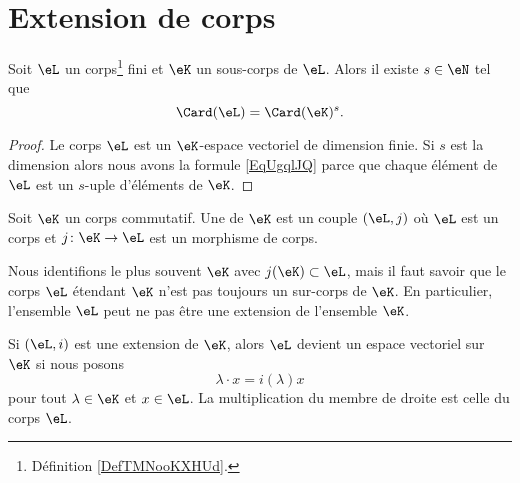 
\section{Extension de corps}
\label{SECooLQVJooTGeqiR}

\begin{lemma}       \label{LemobATFP}
	Soit \( \eL\) un corps\footnote{Définition \ref{DefTMNooKXHUd}.} fini et \( \eK\) un sous-corps de \( \eL\). Alors il existe \( s\in \eN\) tel que
	\begin{equation}        \label{EqUgqlJQ}
		\Card(\eL)=\Card(\eK)^s.
	\end{equation}
\end{lemma}

\begin{proof}
	Le corps \( \eL\) est un \( \eK\)-espace vectoriel de dimension finie. Si \( s\) est la dimension alors nous avons la formule \eqref{EqUgqlJQ} parce que chaque élément de \( \eL\) est un \( s\)-uple d'éléments de \( \eK\).
\end{proof}


\begin{definition}     \label{DEFooFLJJooGJYDOe}
	Soit \( \eK\) un corps commutatif. Une  de \( \eK\) est un couple \( (\eL,j)\) où \( \eL\) est un corps et \( j\colon \eK\to \eL\) est un morphisme de corps.
\end{definition}

Nous identifions le plus souvent \( \eK\) avec \( j(\eK)\subset \eL\), mais il faut savoir que le corps \( \eL\) étendant \( \eK\) n'est pas toujours un sur-corps de \( \eK\). En particulier, l'ensemble \( \eL\) peut ne pas être une extension de l'ensemble \( \eK\).

\begin{lemmaDef}       \label{LemooOLIIooXzdppM}
	Si \( (\eL,i)\) est une extension de \( \eK\), alors \( \eL\) devient un espace vectoriel sur \( \eK\) si nous posons
	\begin{equation}
		\lambda\cdot x=i(\lambda)x
	\end{equation}
	pour tout \( \lambda\in \eK\) et \( x\in \eL\). La multiplication du membre de droite est celle du corps \( \eL\).
\end{lemmaDef}

